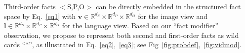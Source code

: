 \documentclass[runningheads]{llncs}
\begin{document}
Third-order facts $<$S,P,O$>$ can be directly embedded in the structured fact space by Eq.~\ref{eq1} with $\mathbf{v} \in  \mathbb{R}^{d_S} \times \mathbb{R}^{d_P} \times \mathbb{R}^{d_O}$ for the image view and $\mathbf{l}  \in  \mathbb{R}^{d_S} \times \mathbb{R}^{d_P} \times \mathbb{R}^{d_O}$ for the language view. %
Based on our ``fact modifier'' observation, we propose to represent both 
second and first-order
facts as wild cards ``$*$'', as illustrated in Eq.~\ref{eq2},~\ref{eq3}; see Fig~\ref{fig:probdef},~\ref{fig:vidmod}.
\end{document}
